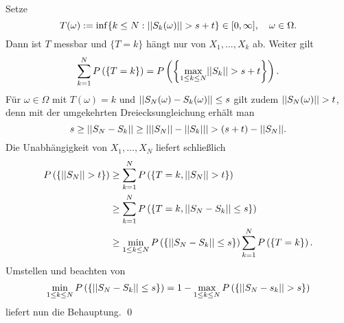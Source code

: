 \begin{proof*}
    Setze 
    $$
        T(\omega) := \inf\{k \leq N: \lvert\lvert S_k(\omega) \rvert\rvert > s + t\} \in [0, \infty], \quad \omega \in \Omega. 
    $$
    Dann ist $T$ messbar und $\{T = k\}$ hängt nur von $X_1,...,X_k$ ab. Weiter gilt 
    $$
        \sum_{k=1}^N P\left(\left\{ T = k \right\}\right) = P\left(\left\{ \max_{1\leq k \leq N}\lvert\lvert S_k \rvert\rvert > s+t \right\}\right).
    $$
    Für $\omega \in \Omega$ mit $T(\omega) = k$ und $\lvert\lvert S_N(\omega) - S_k(\omega) \rvert\rvert \leq s$ gilt zudem $\lvert\lvert S_N(\omega) \rvert\rvert > t$, denn mit der umgekehrten Dreiecksungleichung erhält man
    $$
        s \geq \lvert\lvert S_N - S_k \rvert\rvert \geq \left| \lvert\lvert S_N \rvert\rvert-\lvert\lvert S_k \rvert\rvert \right| > (s+t) - \lvert\lvert S_N \rvert\rvert.
    $$
    Die Unabhängigkeit von $X_1,...,X_N$ liefert schließlich
    \begin{align*}
        P\left(\left\{ \lvert\lvert S_N \rvert\rvert > t \right\}\right) &\geq \sum_{k=1}^N P\left(\left\{ T=k, \lvert\lvert S_N \rvert\rvert > t \right\}\right)  \\\
                              &\geq \sum_{k=1}^N P\left(\left\{ T=k, \lvert\lvert S_N - S_k \rvert\rvert \leq s \right\}\right) \\\
                              &\geq \min_{1\leq k \leq N}P\left(\left\{ \lvert\lvert S_N-S_k \rvert\rvert \leq s \right\}\right) \sum_{k=1}^N P\left(\left\{ T=k \right\}\right). 
    \end{align*}
    Umstellen und beachten von 
    $$
        \min_{1\leq k \leq N}P\left(\left\{ \lvert\lvert S_N-S_k \rvert\rvert \leq s \right\}\right) = 1 - \max_{1\leq k \leq N}P\left(\left\{ \lvert\lvert S_N - s_k \rvert\rvert > s \right\}\right)
    $$
    liefert nun die Behauptung. \qed
\end{proof*}